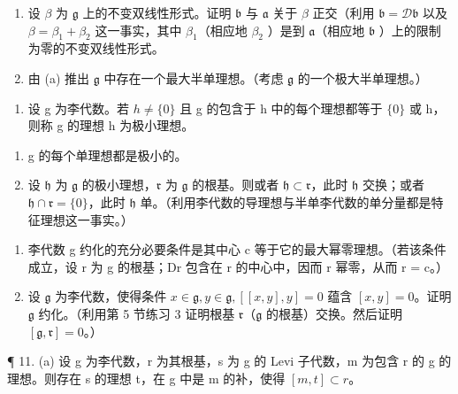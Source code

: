 \begin{enumerate}
\def\labelenumi{(\alph{enumi})}
\setcounter{enumi}{1}
\item
  设 \(\beta\) 为 \(\mathfrak{g}\) 上的不变双线性形式。证明 \(\mathfrak{b}\) 与 \(\mathfrak{a}\) 关于 \(\beta\) 正交（利用 \(\mathfrak{b} = \mathcal{D}\mathfrak{b}\) 以及 \(\beta = \beta_{1} + \beta_{2}\) 这一事实，其中 \(\beta_{1}\)（相应地 \(\beta_{2}\) ）是到 \(\mathfrak{a}\)（相应地 \(\mathfrak{b}\) ）上的限制为零的不变双线性形式。
\item
  由 (a) 推出 \(\mathfrak{g}\) 中存在一个最大半单理想。（考虑 \(\mathfrak{g}\) 的一个极大半单理想。）
\end{enumerate}

\begin{enumerate}
\def\labelenumi{\arabic{enumi}.}
\setcounter{enumi}{7}
\tightlist
\item
  设 g 为李代数。若 \(h \neq \{0\}\) 且 g 的包含于 h 中的每个理想都等于 \(\{0\}\) 或 h，则称 g 的理想 h 为极小理想。
\end{enumerate}

\begin{enumerate}
\def\labelenumi{(\alph{enumi})}
\item
  g 的每个单理想都是极小的。
\item
  设 \(\mathfrak{h}\) 为 \(\mathfrak{g}\) 的极小理想，\(\mathfrak{r}\) 为 \(\mathfrak{g}\) 的根基。则或者 \(\mathfrak{h} \subset \mathfrak{r}\)，此时 \(\mathfrak{h}\) 交换；或者 \(\mathfrak{h} \cap \mathfrak{r} = \{0\}\)，此时 \(\mathfrak{h}\) 单。（利用李代数的导理想与半单李代数的单分量都是特征理想这一事实。）
\end{enumerate}

\begin{enumerate}
\def\labelenumi{\arabic{enumi}.}
\setcounter{enumi}{8}
\item
  李代数 g 约化的充分必要条件是其中心 c 等于它的最大幂零理想。（若该条件成立，设 r 为 g 的根基；Dr 包含在 r 的中心中，因而 r 幂零，从而 r = c。）
\item
  设 \(\mathfrak{g}\) 为李代数，使得条件 \(x \in \mathfrak{g}, y \in \mathfrak{g}, [[x, y], y] = 0\) 蕴含 \([x, y] = 0\)。证明 \(\mathfrak{g}\) 约化。（利用第 5 节练习 3 证明根基 \(\mathfrak{r}\)（\(\mathfrak{g}\) 的根基）交换。然后证明 \([\mathfrak{g}, \mathfrak{r}] = 0\)。）
\end{enumerate}

¶ 11. (a) 设 g 为李代数，r 为其根基，s 为 g 的 Levi 子代数，m 为包含 r 的 g 的理想。则存在 s 的理想 t，在 g 中是 m 的补，使得 \([m, t] \subset r\)。

